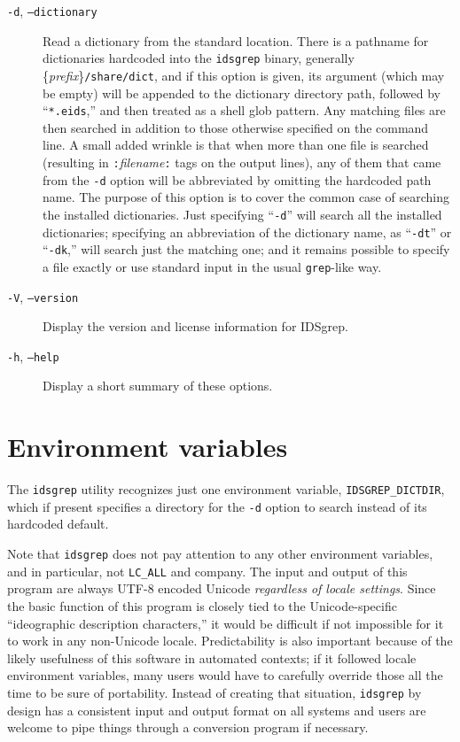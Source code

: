 \documentclass[twocolumn]{report}
\begin{document}
\begin{description}

\item[\texttt{-d}, \texttt{--dictionary}]
Read a dictionary
from the standard location.  There is a pathname for dictionaries hardcoded
into the \texttt{idsgrep} binary, generally
\{\emph{prefix}\}\texttt{/share/dict}, and if this option is given, its
argument (which may be empty) will be appended to the dictionary directory
path, followed by ``\texttt{*.eids},'' and then treated as a shell glob
pattern.  Any matching files are then searched in addition to those
otherwise specified on the command line.  A small added wrinkle is that when
more than one file is searched (resulting in
\texttt{:}\textit{filename}\texttt{:} tags on the output lines), any of them
that came from the \texttt{-d} option will be abbreviated by omitting the
hardcoded path name.  The purpose of this option is to cover the common case
of searching the installed dictionaries.  Just specifying ``\texttt{-d}''
will search all the installed dictionaries; specifying an abbreviation of
the dictionary name, as ``\texttt{-dt}'' or ``\texttt{-dk},'' will search
just the matching one; and it remains possible to specify a file exactly or
use standard input in the usual \texttt{grep}-like way.

\item[\texttt{-V}, \texttt{--version}] Display the version and license
information for IDSgrep.

\item[\texttt{-h}, \texttt{--help}] Display a short summary of these
options.

\end{description}


\section{Environment variables}

The \texttt{idsgrep} utility recognizes just one environment variable,
\texttt{IDSGREP\_DICTDIR}, which if present specifies a directory for the
\texttt{-d} option to search instead of its hardcoded default.

Note that \texttt{idsgrep} does not pay attention to any other environment
variables, and in particular, not \texttt{LC\_ALL} and company.  The input
and output of this program are always UTF-8 encoded Unicode \emph{regardless
of locale settings}.  Since the basic function of this program is closely
tied to the Unicode-specific ``ideographic description characters,'' it
would be difficult if not impossible for it to work in any non-Unicode
locale.  Predictability is also important because of the likely usefulness
of this software in automated contexts; if it followed locale environment
variables, many users would have to carefully override those all the time to
be sure of portability.  Instead of creating that situation,
\texttt{idsgrep} by design has a consistent input and output format on all
systems and users are welcome to pipe things through
a conversion program if necessary.
\end{document}

